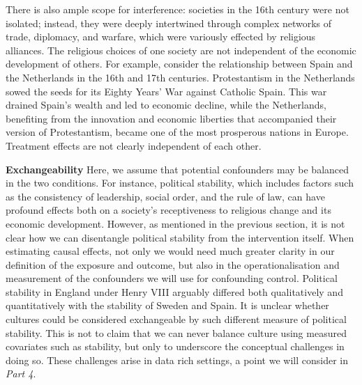 \documentclass[
  singlecolumn]{report}
\begin{document}
There is also ample scope for interference: societies in the 16th
century were not isolated; instead, they were deeply intertwined through
complex networks of trade, diplomacy, and warfare, which were variously
effected by religious alliances. The religious choices of one society
are not independent of the economic development of others. For example,
consider the relationship between Spain and the Netherlands in the 16th
and 17th centuries. Protestantism in the Netherlands sowed the seeds for
its Eighty Years' War against Catholic Spain. This war drained Spain's
wealth and led to economic decline, while the Netherlands, benefiting
from the innovation and economic liberties that accompanied their
version of Protestantism, became one of the most prosperous nations in
Europe. Treatment effects are not clearly independent of each other.

\textbf{Exchangeability} Here, we assume that potential confounders may
be balanced in the two conditions. For instance, political stability,
which includes factors such as the consistency of leadership, social
order, and the rule of law, can have profound effects both on a
society's receptiveness to religious change and its economic
development. However, as mentioned in the previous section, it is not
clear how we can disentangle political stability from the intervention
itself. When estimating causal effects, not only we would need much
greater clarity in our definition of the exposure and outcome, but also
in the operationalisation and measurement of the confounders we will use
for confounding control. Political stability in England under Henry VIII
arguably differed both qualitatively and quantitatively with the
stability of Sweden and Spain. It is unclear whether cultures could be
considered exchangeable by such different measure of political
stability. This is not to claim that we can never balance culture using
measured covariates such as stability, but only to underscore the
conceptual challenges in doing so. These challenges arise in data rich
settings, a point we will consider in \emph{Part 4}.
\end{document}
